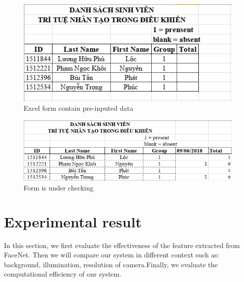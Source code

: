 \documentclass[journal, twocolumn]{IEEEtran}
\begin{document}
\begin{figure}
    \centering
    \includegraphics[width=0.8\linewidth]{img/form-data.png}
	\caption{Excel form contain pre-inputed data}\label{fig:form-data}
\end{figure}

\begin{figure}
    \centering
    \includegraphics[width=0.8\linewidth]{img/form-checked.png}
	\caption{Form is under checking}\label{fig:form-checked}
\end{figure}


\medskip
\section{Experimental result}
In this section, we first evaluate the effectiveness of the feature extracted from FaceNet. Then we will compare our system in different context such as: background, illumination, resolution of camera.Finally, we evaluate the computational efficiency of our system.
\label{experimental-result}
\end{document}
